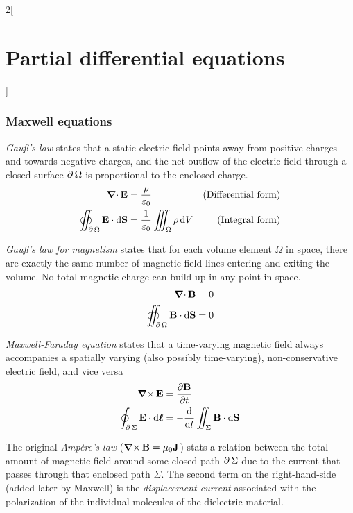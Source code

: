 \documentclass[../../../main.tex]{subfiles}
\begin{document}
\begin{multicols}{2}[\section{Partial differential equations}]
  \subsubsection{Maxwell equations}
  \begin{proposition}
    \emph{Gau\ss's law} states that a static electric field points away from positive charges and towards negative charges, and the net outflow of the electric field through a closed surface $\operatorname{\partial}{\Omega}$ is proportional to the enclosed charge.
    \begin{align*}
      \operatorname{\boldsymbol{\mathrm{\nabla}}\cdot}\boldsymbol{\mathrm{E}}                                 & =\frac{\rho}{\varepsilon_0}                     & \text{(Differential form)} \\
      \oiint_{\operatorname{\partial}{\Omega}}\boldsymbol{\mathrm{E}}\cdot \dd{\boldsymbol{\mathrm{S}}} & =\frac{1}{\varepsilon_0}\iiint_\Omega\rho\dd{V} & \text{(Integral form)}
    \end{align*}
  \end{proposition}
  \begin{proposition}
    \emph{Gau\ss's law for magnetism} states that for each volume element $\Omega$ in space, there are exactly the same number of magnetic field lines entering and exiting the volume. No total magnetic charge can build up in any point in space.
    \begin{align*}
      \operatorname{\boldsymbol{\mathrm{\nabla}}\cdot}\boldsymbol{\mathrm{B}}                                 & =0 \\
      \oiint_{\operatorname{\partial}{\Omega}}\boldsymbol{\mathrm{B}}\cdot \dd{\boldsymbol{\mathrm{S}}} & =0
    \end{align*}
  \end{proposition}
  \begin{proposition}
    \emph{Maxwell-Faraday equation} states that a time-varying magnetic field always accompanies a spatially varying (also possibly time-varying), non-conservative electric field, and vice versa
    \begin{align*}
      \operatorname{\boldsymbol{\mathrm{\nabla}}\times}\boldsymbol{\mathrm{E}}                                   & =\pdv{\boldsymbol{\mathrm{B}}}{t}                              \\
      \oint_{\operatorname{\partial}{\Sigma}}\boldsymbol{\mathrm{E}}\cdot \dd{\boldsymbol{\mathrm{\ell}}} & =-\dv{}{t}\iint_\Sigma\boldsymbol{\mathrm{B}}\cdot \dd{\boldsymbol{\mathrm{S}}}
    \end{align*}
  \end{proposition}
  \begin{proposition}
    The original \emph{Ampère's law} ($\operatorname{\boldsymbol{\mathrm{\nabla}}\times}\boldsymbol{\mathrm{B}}=\mu_0\boldsymbol{\mathrm{J}}$) stats a relation between the total amount of magnetic field around some closed path $\operatorname{\partial}{\Sigma}$ due to the current that passes through that enclosed path $\Sigma$. The second term on the right-hand-side (added later by Maxwell) is the \emph{displacement current} associated with the polarization of the individual molecules of the dielectric material.

\end{proposition}
\end{multicols}
\end{document}
